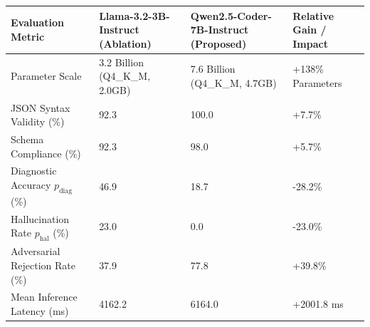 \begin{tabular}{llll}
\toprule
Evaluation Metric & Llama-3.2-3B-Instruct (Ablation) & Qwen2.5-Coder-7B-Instruct (Proposed) & Relative Gain / Impact \\
\midrule
Parameter Scale & 3.2 Billion (Q4\_K\_M, 2.0GB) & 7.6 Billion (Q4\_K\_M, 4.7GB) & +138\% Parameters \\
JSON Syntax Validity (\%) & 92.3 & 100.0 & +7.7\% \\
Schema Compliance (\%) & 92.3 & 98.0 & +5.7\% \\
Diagnostic Accuracy $p_{\text{diag}}$ (\%) & 46.9 & 18.7 & -28.2\% \\
Hallucination Rate $p_{\text{hal}}$ (\%) & 23.0 & 0.0 & -23.0\% \\
Adversarial Rejection Rate (\%) & 37.9 & 77.8 & +39.8\% \\
Mean Inference Latency (ms) & 4162.2 & 6164.0 & +2001.8 ms \\
\bottomrule
\end{tabular}
